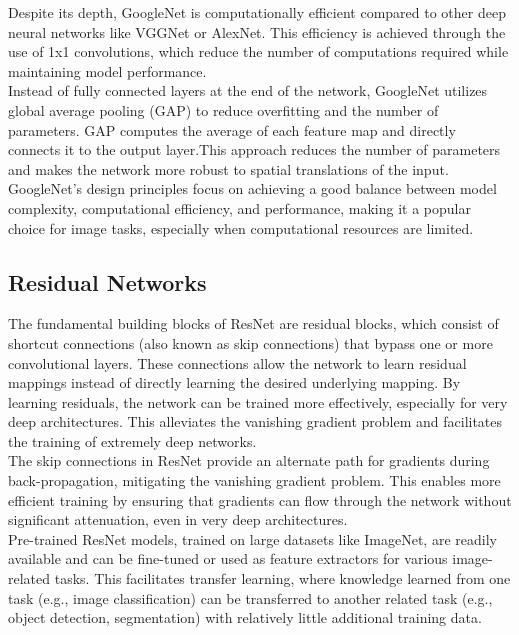 \documentclass{article}
\begin{document}
Despite its depth, GoogleNet is computationally efficient compared to other deep neural networks like VGGNet or AlexNet. This efficiency is achieved through the use of 1x1 convolutions, which reduce the number of computations required while maintaining model performance.\\

Instead of fully connected layers at the end of the network, GoogleNet utilizes global average pooling (GAP) to reduce overfitting and the number of parameters. GAP computes the average of each feature map and directly connects it to the output layer.This approach reduces the number of parameters and makes the network more robust to spatial translations of the input.\\


GoogleNet's design principles focus on achieving a good balance between model complexity, computational efficiency, and performance, making it a popular choice for image tasks, especially when computational resources are limited.\\
\subsection{Residual Networks}

The fundamental building blocks of ResNet are residual blocks, which consist of shortcut connections (also known as skip connections) that bypass one or more convolutional layers. These connections allow the network to learn residual mappings instead of directly learning the desired underlying mapping. By learning residuals, the network can be trained more effectively, especially for very deep architectures. This alleviates the vanishing gradient problem and facilitates the training of extremely deep networks.\\

The skip connections in ResNet provide an alternate path for gradients during back-propagation, mitigating the vanishing gradient problem. This enables more efficient training by ensuring that gradients can flow through the network without significant attenuation, even in very deep architectures.\\

Pre-trained ResNet models, trained on large datasets like ImageNet, are readily available and can be fine-tuned or used as feature extractors for various image-related tasks. This facilitates transfer learning, where knowledge learned from one task (e.g., image classification) can be transferred to another related task (e.g., object detection, segmentation) with relatively little additional training data.\\
\end{document}
